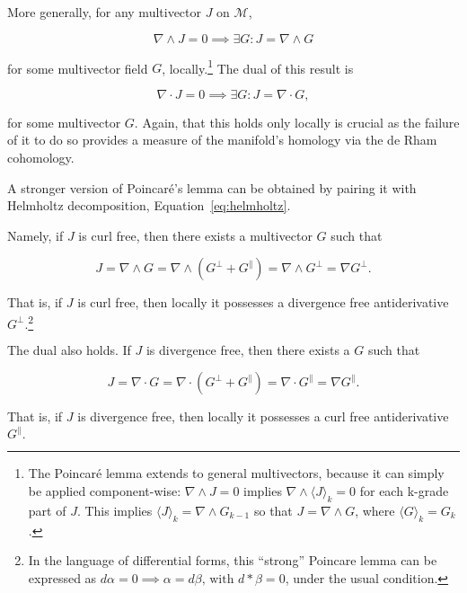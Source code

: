 \documentclass{article}
\begin{document}
More generally, for any multivector $J$ on $\mathcal{M}$, 

\begin{equation}
    \nabla \wedge J = 0 \implies \exists G : J = \nabla \wedge G
\end{equation} 

for some multivector field $G$, locally.\footnote{The Poincar\'e lemma extends to general multivectors, because it can simply be applied component-wise: $\nabla \wedge J = 0$ implies $\nabla \wedge \langle J \rangle_k = 0$ for each k-grade part of $J$. This implies $\langle J \rangle_k = \nabla \wedge G_{k-1}$ so that $J = \nabla \wedge G$, where $\langle G \rangle_k = G_k$.} The dual of this result is

\begin{equation}
    \nabla \cdot J = 0 \implies \exists G : J = \nabla \cdot G,
\end{equation}

for some multivector $G$. Again, that this holds only locally is crucial as the failure of it to do so provides a measure of the manifold's homology via the de Rham cohomology.

A stronger version of Poincar\'e's lemma can be obtained by pairing it with Helmholtz decomposition, Equation~\ref{eq:helmholtz}.

Namely, if $J$ is curl free, then there exists a multivector $G$ such that

\begin{equation}
    J = \nabla \wedge G = \nabla \wedge (G^\perp + G^\parallel) = \nabla \wedge G^\perp = \nabla G^\perp.
\end{equation}

That is, if $J$ is curl free, then locally it possesses a divergence free antiderivative $G^\perp.$\footnote{In the language of differential forms, this ``strong'' Poincare lemma can be expressed as ${d \alpha = 0 \implies \alpha = d \beta \text{, with } d * \beta = 0}$, under the usual condition.}

The dual also holds. If $J$ is divergence free, then there exists a $G$ such that

\begin{equation}
    J = \nabla \cdot G = \nabla \cdot (G^\perp + G^\parallel) = \nabla \cdot G^\parallel = \nabla G^\parallel.
\end{equation}

That is, if $J$ is divergence free, then locally it possesses a curl free antiderivative $G^\parallel.$ 
\end{document}
